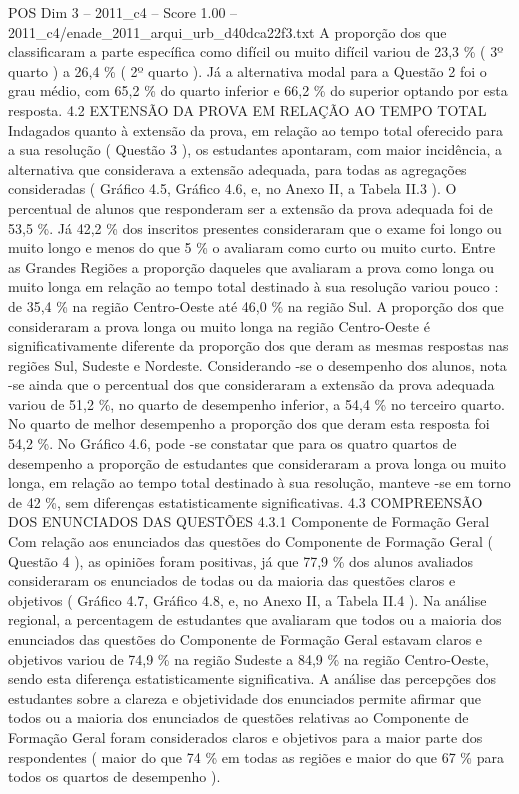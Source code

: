 \begin{textsample}{POS Dim 3 – 2011\_c4 – Score 1.00 – 2011\_c4/enade\_2011\_arqui\_urb\_d40dca22f3.txt}
A proporção dos que classificaram a parte específica como difícil ou muito difícil variou de 23,3 \% ( 3º quarto ) a 26,4 \% ( 2º quarto ).
Já a alternativa modal para a Questão 2 foi o grau médio, com 65,2 \% do quarto inferior e 66,2 \% do superior optando por esta resposta. 4.2 EXTENSÃO DA PROVA EM RELAÇÃO AO TEMPO TOTAL Indagados quanto à extensão da prova, em relação ao tempo total oferecido para a sua resolução ( Questão 3 ), os estudantes apontaram, com maior incidência, a alternativa que considerava a extensão adequada, para todas as agregações consideradas ( Gráfico 4.5, Gráfico 4.6, e, no Anexo II, a Tabela II.3 ).
O percentual de alunos que responderam ser a extensão da prova adequada foi de 53,5 \%.
Já 42,2 \% dos inscritos presentes consideraram que o exame foi longo ou muito longo e menos do que 5 \% o avaliaram como curto ou muito curto.
Entre as Grandes Regiões a proporção daqueles que avaliaram a prova como longa ou muito longa em relação ao tempo total destinado à sua resolução variou pouco : de 35,4 \% na região Centro-Oeste até 46,0 \% na região Sul.
A proporção dos que consideraram a prova longa ou muito longa na região Centro-Oeste é significativamente diferente da proporção dos que deram as mesmas respostas nas regiões Sul, Sudeste e Nordeste.
Considerando -se o desempenho dos alunos, nota -se ainda que o percentual dos que consideraram a extensão da prova adequada variou de 51,2 \%, no quarto de desempenho inferior, a 54,4 \% no terceiro quarto.
No quarto de melhor desempenho a proporção dos que deram esta resposta foi 54,2 \%.
No Gráfico 4.6, pode -se constatar que para os quatro quartos de desempenho a proporção de estudantes que consideraram a prova longa ou muito longa, em relação ao tempo total destinado à sua resolução, manteve -se em torno de 42 \%, sem diferenças estatisticamente significativas. 4.3 COMPREENSÃO DOS ENUNCIADOS DAS QUESTÕES 4.3.1 Componente de Formação Geral Com relação aos enunciados das questões do Componente de Formação Geral ( Questão 4 ), as opiniões foram positivas, já que 77,9 \% dos alunos avaliados consideraram os enunciados de todas ou da maioria das questões claros e objetivos ( Gráfico 4.7, Gráfico 4.8, e, no Anexo II, a Tabela II.4 ).
Na análise regional, a percentagem de estudantes que avaliaram que todos ou a maioria dos enunciados das questões do Componente de Formação Geral estavam claros e objetivos variou de 74,9 \% na região Sudeste a 84,9 \% na região Centro-Oeste, sendo esta diferença estatisticamente significativa.
A análise das percepções dos estudantes sobre a clareza e objetividade dos enunciados permite afirmar que todos ou a maioria dos enunciados de questões relativas ao Componente de Formação Geral foram considerados claros e objetivos para a maior parte dos respondentes ( maior do que 74 \% em todas as regiões e maior do que 67 \% para todos os quartos de desempenho ).

\end{textsample}
